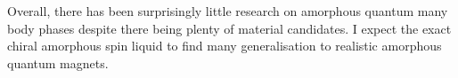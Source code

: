Overall, there has been surprisingly little research on amorphous quantum many body phases despite there being plenty of material candidates. I expect the exact chiral amorphous spin liquid to find many generalisation to realistic amorphous quantum magnets.

\begin{lstlisting}[language=Python]
\end{lstlisting}
